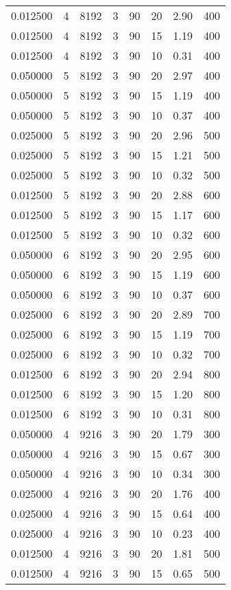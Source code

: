 \documentclass[12pt,letterpaper]{article}
\begin{document}
\begin{center}
\begin{longtable}{r|r|r|r|r|r|r|r}
0.012500 & 4 & 8192 & 3 & 90 & 20 & 2.90 & 400 \\
0.012500 & 4 & 8192 & 3 & 90 & 15 & 1.19 & 400 \\
0.012500 & 4 & 8192 & 3 & 90 & 10 & 0.31 & 400 \\
0.050000 & 5 & 8192 & 3 & 90 & 20 & 2.97 & 400 \\
0.050000 & 5 & 8192 & 3 & 90 & 15 & 1.19 & 400 \\
0.050000 & 5 & 8192 & 3 & 90 & 10 & 0.37 & 400 \\
0.025000 & 5 & 8192 & 3 & 90 & 20 & 2.96 & 500 \\
0.025000 & 5 & 8192 & 3 & 90 & 15 & 1.21 & 500 \\
0.025000 & 5 & 8192 & 3 & 90 & 10 & 0.32 & 500 \\
0.012500 & 5 & 8192 & 3 & 90 & 20 & 2.88 & 600 \\
0.012500 & 5 & 8192 & 3 & 90 & 15 & 1.17 & 600 \\
0.012500 & 5 & 8192 & 3 & 90 & 10 & 0.32 & 600 \\
0.050000 & 6 & 8192 & 3 & 90 & 20 & 2.95 & 600 \\
0.050000 & 6 & 8192 & 3 & 90 & 15 & 1.19 & 600 \\
0.050000 & 6 & 8192 & 3 & 90 & 10 & 0.37 & 600 \\
0.025000 & 6 & 8192 & 3 & 90 & 20 & 2.89 & 700 \\
0.025000 & 6 & 8192 & 3 & 90 & 15 & 1.19 & 700 \\
0.025000 & 6 & 8192 & 3 & 90 & 10 & 0.32 & 700 \\
0.012500 & 6 & 8192 & 3 & 90 & 20 & 2.94 & 800 \\
0.012500 & 6 & 8192 & 3 & 90 & 15 & 1.20 & 800 \\
0.012500 & 6 & 8192 & 3 & 90 & 10 & 0.31 & 800 \\
0.050000 & 4 & 9216 & 3 & 90 & 20 & 1.79 & 300 \\
0.050000 & 4 & 9216 & 3 & 90 & 15 & 0.67 & 300 \\
0.050000 & 4 & 9216 & 3 & 90 & 10 & 0.34 & 300 \\
0.025000 & 4 & 9216 & 3 & 90 & 20 & 1.76 & 400 \\
0.025000 & 4 & 9216 & 3 & 90 & 15 & 0.64 & 400 \\
0.025000 & 4 & 9216 & 3 & 90 & 10 & 0.23 & 400 \\
0.012500 & 4 & 9216 & 3 & 90 & 20 & 1.81 & 500 \\
0.012500 & 4 & 9216 & 3 & 90 & 15 & 0.65 & 500 \\

\end{longtable}
\end{center}
\end{document}
